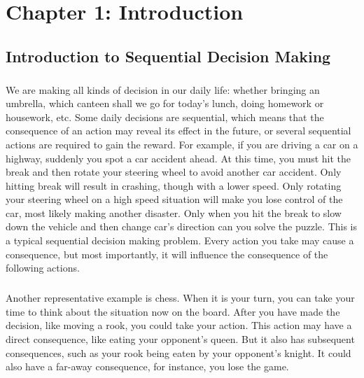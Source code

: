 
\chapter{Chapter 1: Introduction} %

\label{Chapter 1} %


\section{Introduction to Sequential Decision Making}
\paragraph{}
We are making all kinds of decision in our daily life: whether bringing an umbrella, which canteen shall we go for today's lunch, doing homework or housework, etc. Some daily decisions are sequential, which means that the consequence of an action may reveal its effect in the future, or several sequential actions are required to gain the reward. For example, if you are driving a car on a highway, suddenly you spot a car accident ahead. At this time, you must hit the break and then rotate your steering wheel to avoid another car accident. Only hitting break will result in crashing, though with a lower speed. Only rotating your steering wheel on a high speed situation will make you lose control of the car, most likely making another disaster. Only when you hit the break to slow down the vehicle and then change car's direction can you solve the puzzle. This is a typical sequential decision making problem. Every action you take may cause a consequence, but most importantly, it will influence the consequence of the following actions. 
\paragraph{}
Another representative example is chess. When it is your turn, you can take your time to think about the situation now on the board. After you have made the decision, like moving a rook, you could take your action. This action may have a direct consequence, like eating your opponent's queen. But it also has subsequent consequences, such as your rook being eaten by your opponent's knight. It could also have a far-away consequence, for instance, you lose the game. 


